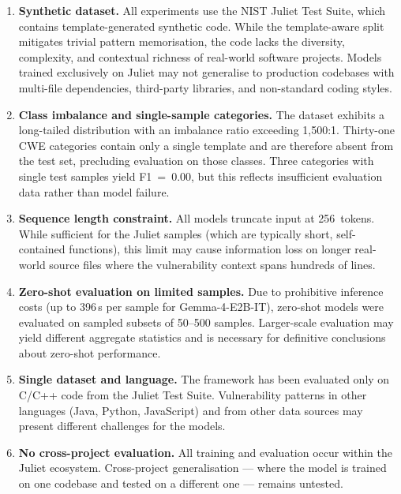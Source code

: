 \begin{enumerate}
    \item \textbf{Synthetic dataset.}
          All experiments use the NIST Juliet Test Suite, which contains
          template-generated synthetic code.  While the template-aware split
          mitigates trivial pattern memorisation, the code lacks the
          diversity, complexity, and contextual richness of real-world
          software projects.  Models trained exclusively on Juliet may not
          generalise to production codebases with multi-file dependencies,
          third-party libraries, and non-standard coding styles.

    \item \textbf{Class imbalance and single-sample categories.}
          The dataset exhibits a long-tailed distribution with an imbalance
          ratio exceeding 1,500:1.  Thirty-one CWE categories contain only
          a single template and are therefore absent from the test set,
          precluding evaluation on those classes.  Three categories with
          single test samples yield F1~=~0.00, but this reflects
          insufficient evaluation data rather than model failure.

    \item \textbf{Sequence length constraint.}
          All models truncate input at 256~tokens.  While sufficient for the
          Juliet samples (which are typically short, self-contained
          functions), this limit may cause information loss on longer
          real-world source files where the vulnerability context spans
          hundreds of lines.

    \item \textbf{Zero-shot evaluation on limited samples.}
          Due to prohibitive inference costs (up to 396\,s per sample for
          Gemma-4-E2B-IT), zero-shot models were evaluated on sampled
          subsets of 50--500 samples.  Larger-scale evaluation may yield
          different aggregate statistics and is necessary for definitive
          conclusions about zero-shot performance.

    \item \textbf{Single dataset and language.}
          The framework has been evaluated only on C/C++ code from the
          Juliet Test Suite.  Vulnerability patterns in other languages
          (Java, Python, JavaScript) and from other data sources may
          present different challenges for the models.

    \item \textbf{No cross-project evaluation.}
          All training and evaluation occur within the Juliet ecosystem.
          Cross-project generalisation --- where the model is trained on one
          codebase and tested on a different one --- remains untested.


\end{enumerate}
